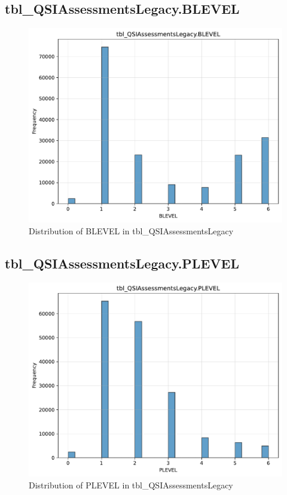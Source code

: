 \subsection{tbl\_QSIAssessmentsLegacy.BLEVEL}

\begin{figure}[htbp]
\centering
\includegraphics[width=\textwidth]{figures/dbo_tbl_QSIAssessmentsLegacy_BLEVEL.pdf}
\caption{Distribution of BLEVEL in tbl\_QSIAssessmentsLegacy}
\end{figure}\newpage

\subsection{tbl\_QSIAssessmentsLegacy.PLEVEL}

\begin{figure}[htbp]
\centering
\includegraphics[width=\textwidth]{figures/dbo_tbl_QSIAssessmentsLegacy_PLEVEL.pdf}
\caption{Distribution of PLEVEL in tbl\_QSIAssessmentsLegacy}
\end{figure}\newpage


